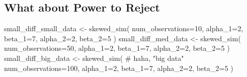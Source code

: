 \documentclass[
  letterpaper,
  DIV=11,
  numbers=noendperiod]{scrreprt}
\newenvironment{Shaded}{\begin{snugshade}}{\end{snugshade}}
\newcommand{\AttributeTok}[1]{\textcolor[rgb]{0.40,0.45,0.13}{#1}}
\newcommand{\CommentTok}[1]{\textcolor[rgb]{0.37,0.37,0.37}{#1}}
\newcommand{\DecValTok}[1]{\textcolor[rgb]{0.68,0.00,0.00}{#1}}
\newcommand{\FunctionTok}[1]{\textcolor[rgb]{0.28,0.35,0.67}{#1}}
\newcommand{\NormalTok}[1]{\textcolor[rgb]{0.00,0.23,0.31}{#1}}
\newcommand{\OtherTok}[1]{\textcolor[rgb]{0.00,0.23,0.31}{#1}}
\begin{document}
\subsection{What about Power to
Reject}\label{what-about-power-to-reject}

\begin{Shaded}
\begin{Highlighting}[]
\NormalTok{small\_diff\_small\_data }\OtherTok{\textless{}{-}} \FunctionTok{skewed\_sim}\NormalTok{(}
  \AttributeTok{num\_observations=}\DecValTok{10}\NormalTok{, }
  \AttributeTok{alpha\_1=}\DecValTok{2}\NormalTok{, }\AttributeTok{beta\_1=}\DecValTok{7}\NormalTok{, }
  \AttributeTok{alpha\_2=}\DecValTok{2}\NormalTok{, }\AttributeTok{beta\_2=}\DecValTok{5}
\NormalTok{  )}
\NormalTok{small\_diff\_med\_data }\OtherTok{\textless{}{-}} \FunctionTok{skewed\_sim}\NormalTok{(}
  \AttributeTok{num\_observations=}\DecValTok{50}\NormalTok{, }
  \AttributeTok{alpha\_1=}\DecValTok{2}\NormalTok{, }\AttributeTok{beta\_1=}\DecValTok{7}\NormalTok{, }
  \AttributeTok{alpha\_2=}\DecValTok{2}\NormalTok{, }\AttributeTok{beta\_2=}\DecValTok{5}
\NormalTok{  )}
\NormalTok{small\_diff\_big\_data }\OtherTok{\textless{}{-}} \FunctionTok{skewed\_sim}\NormalTok{( }\CommentTok{\# haha, "big data"}
  \AttributeTok{num\_observations=}\DecValTok{100}\NormalTok{, }
  \AttributeTok{alpha\_1=}\DecValTok{2}\NormalTok{, }\AttributeTok{beta\_1=}\DecValTok{7}\NormalTok{, }
  \AttributeTok{alpha\_2=}\DecValTok{2}\NormalTok{, }\AttributeTok{beta\_2=}\DecValTok{5}
\NormalTok{  )}
\end{Highlighting}
\end{Shaded}
\end{document}
